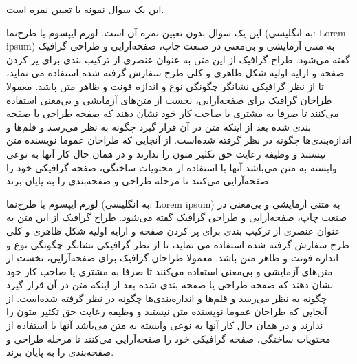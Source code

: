 \documentclass[a4paper, 12pt]{exam}
\begin{document}
\begin{questions}
	
	\question[10]
	این یک سوال نمونه با تعیین نمره است.
	\question
	این یک سوال بدون تعیین نمره آن است.
	لورم ایپسوم یا طرح‌نما (به انگلیسی: Lorem ipsum) به متنی آزمایشی و بی‌معنی در صنعت چاپ، صفحه‌آرایی و طراحی گرافیک گفته می‌شود. طراح گرافیک از این متن به عنوان عنصری از ترکیب بندی برای پر کردن صفحه و ارایه اولیه شکل ظاهری و کلی طرح سفارش گرفته شده استفاده می نماید، تا از نظر گرافیکی نشانگر چگونگی نوع و اندازه فونت و ظاهر متن باشد. معمولا طراحان گرافیک برای صفحه‌آرایی، نخست از متن‌های آزمایشی و بی‌معنی استفاده می‌کنند تا صرفا به مشتری یا صاحب کار خود نشان دهند که صفحه طراحی یا صفحه بندی شده بعد از اینکه متن در آن قرار گیرد چگونه به نظر می‌رسد و قلم‌ها و اندازه‌بندی‌ها چگونه در نظر گرفته شده‌است. از آنجایی که طراحان عموما نویسنده متن نیستند و وظیفه رعایت حق تکثیر متون را ندارند و در همان حال کار آنها به نوعی وابسته به متن می‌باشد آنها با استفاده از محتویات ساختگی، صفحه گرافیکی خود را صفحه‌آرایی می‌کنند تا مرحله طراحی و صفحه‌بندی را به پایان برند.
	
	\question
	لورم ایپسوم یا طرح‌نما (به انگلیسی: Lorem ipsum) به متنی آزمایشی و بی‌معنی در صنعت چاپ، صفحه‌آرایی و طراحی گرافیک گفته می‌شود. طراح گرافیک از این متن به عنوان عنصری از ترکیب بندی برای پر کردن صفحه و ارایه اولیه شکل ظاهری و کلی طرح سفارش گرفته شده استفاده می نماید، تا از نظر گرافیکی نشانگر چگونگی نوع و اندازه فونت و ظاهر متن باشد. معمولا طراحان گرافیک برای صفحه‌آرایی، نخست از متن‌های آزمایشی و بی‌معنی استفاده می‌کنند تا صرفا به مشتری یا صاحب کار خود نشان دهند که صفحه طراحی یا صفحه بندی شده بعد از اینکه متن در آن قرار گیرد چگونه به نظر می‌رسد و قلم‌ها و اندازه‌بندی‌ها چگونه در نظر گرفته شده‌است. از آنجایی که طراحان عموما نویسنده متن نیستند و وظیفه رعایت حق تکثیر متون را ندارند و در همان حال کار آنها به نوعی وابسته به متن می‌باشد آنها با استفاده از محتویات ساختگی، صفحه گرافیکی خود را صفحه‌آرایی می‌کنند تا مرحله طراحی و صفحه‌بندی را به پایان برند.
	

\end{questions}
\end{document}
